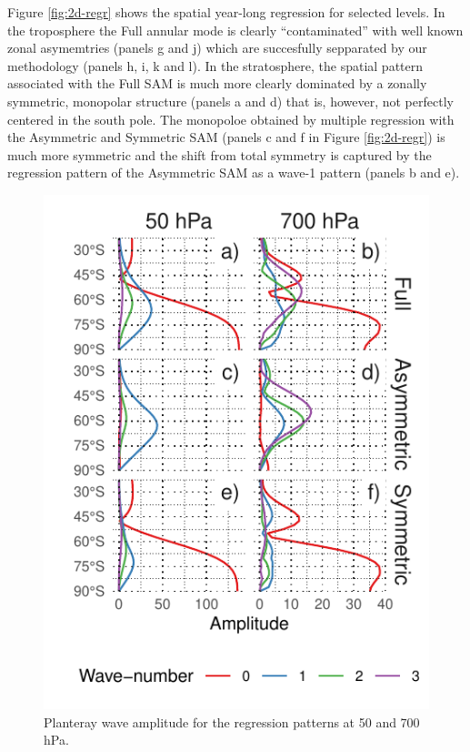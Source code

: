 \documentclass[]{ametsocV5}
\begin{document}
Figure \ref{fig:2d-regr} shows the spatial year-long regression for
selected levels. In the troposphere the Full annular mode is clearly
``contaminated'' with well known zonal asymemtries (panels g and j)
which are succesfully sepparated by our methodology (panels h, i, k and
l). In the stratosphere, the spatial pattern associated with the Full
SAM is much more clearly dominated by a zonally symmetric, monopolar
structure (panels a and d) that is, however, not perfectly centered in
the south pole. The monopoloe obtained by multiple regression with the
Asymmetric and Symmetric SAM (panels c and f in Figure
\ref{fig:2d-regr}) is much more symmetric and the shift from total
symmetry is captured by the regression pattern of the Asymmetric SAM as
a wave-1 pattern (panels b and e).

\begin{figure}
\includegraphics{wave-amplitude-1} \caption[Planteray wave amplitude for the regression patterns at 50 and 700 hPa]{Planteray wave amplitude for the regression patterns at 50 and 700 hPa.}\label{fig:wave-amplitude}
\end{figure}
\end{document}
